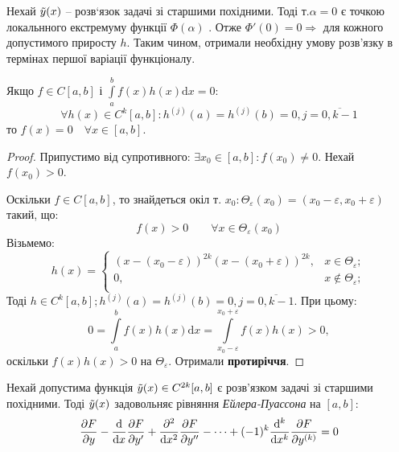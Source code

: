 Нехай $\tilde{y}(x)$ -- розв`язок задачі зі старшими похідними. Тоді т.$\alpha = 0 $ є точкою локальнного екстремуму функції $\Phi (\alpha)$ . Отже $\Phi' (0) = 0 \Longrightarrow$  для кожного допустимого приросту $h$. Таким чином, отримали необхідну умову розв'язку в термінах першої варіації функціоналу.
\begin{lema}
Якщо $f \in C[a,b] $ і $ \int\limits_{a}^{b}{f(x)h(x) \mathrm{d} x}  = 0$:
$$
\forall h(x) \in C^{k}[a,b] : h^{(j)} (a) = h^{(j)} (b) = 0 , j = \overline{0, k-1}
$$
то $f(x) = 0 \quad \forall x\in [a,b]$.
\end{lema}
\begin{proof}
 Припустимо від супротивного: $\exists x_0 \in [a,b] : f(x_0) \neq 0$. Нехай $f(x_0)>0$.\par
 Оскільки $f\in C[a,b]$, то знайдеться окіл т. $x_0 : \Theta_{\varepsilon} (x_0) = (x_0 - \varepsilon, x_0 + \varepsilon )$ такий, що:
 $$
 f(x) >0 \qquad \forall x \in \Theta_{\varepsilon}(x_0)
 $$
 Візьмемо:
 $$
 h(x) = \begin{cases}
  (x - (x_0 - \varepsilon))^{2k} (x - (x_0 + \varepsilon))^{2k}, & x \in \Theta_{\varepsilon};\\
  0 , & x \notin \Theta_{\varepsilon};\\
 \end{cases}
 $$
 Тоді $h \in C^{k}[a,b] ; h^{(j)} (a) = h^{(j)}(b) = 0, j=\overline{0, k-1}$. При цьому:
 $$
 0 =  \int\limits_{a}^{b}{ f(x) h(x) \mathrm{d} x} =  \int\limits_{x_0 - \varepsilon}^{x_0 + \varepsilon}{f(x) h(x)} >0,
 $$
 оскільки $f(x)h(x) >0$ на $\Theta_{\varepsilon}$. Отримали \textbf{протиріччя}.
\end{proof}
\newpage

\begin{boxteo}
 Нехай допустима функція $\tilde{y} (x) \in C^{2k} [a,b]$ є розв'язком задачі зі старшими похідними. Тоді $\tilde{y}(x)$ задовольняє рівняння \textit{Ейлера-Пуассона} на $[a,b]$:
 $$
 \frac{\partial F}{\partial y} - \frac{\mathrm{d}}{\mathrm{d} x} \frac{\partial F}{\partial y'} + \frac{\partial^2}{\mathrm{d} x^2} \frac{\partial F}{\partial y''} - \dots + (-1)^k \frac{\mathrm{d}^k}{\mathrm{d} x^k} \frac{\partial F}{\partial y^{(k)}} = 0
 $$
\end{boxteo}

